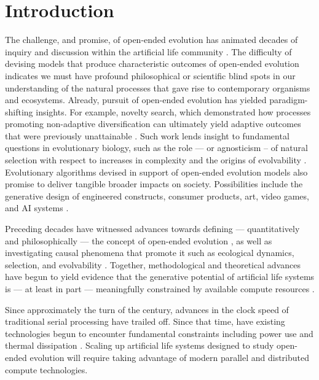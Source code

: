 \section{Introduction}

The challenge, and promise, of open-ended evolution has animated decades of inquiry and discussion within the artificial life community \citep{packard2019overview}.
The difficulty of devising models that produce characteristic outcomes of open-ended evolution indicates we must have profound philosophical or scientific blind spots in our understanding of the natural processes that gave rise to contemporary organisms and ecosystems.
Already, pursuit of open-ended evolution has yielded paradigm-shifting insights.
For example, novelty search, which demonstrated how processes promoting non-adaptive diversification can ultimately yield adaptive outcomes that were previously unattainable \citep{lehman2011abandoning}.
Such work lends insight to fundamental questions in evolutionary biology, such as the role --- or agnosticism -- of natural selection with respect to increases in complexity \citep{lehman2012evolution, lynch2007frailty} and the origins of evolvability \citep{lehman2013evolvability, kirschner1998evolvability}.
Evolutionary algorithms devised in support of open-ended evolution models also promise to deliver tangible broader impacts on society. %
Possibilities include the generative design of engineered constructs, consumer products, art, video games, and AI systems \citep{nguyen2015innovation, stanley2017open}.

Preceding decades have witnessed advances towards defining --- quantitatively and philosophically --- the concept of open-ended evolution \citep{lehman2012beyond, dolson2019modes, bedau1998classification}, as well as investigating causal phenomena that promote it such as ecological dynamics, selection, and evolvability \citep{dolson2019constructive, soros2014identifying, huizinga2018emergence}.
Together, methodological and theoretical advances have begun to yield evidence that the generative potential of artificial life systems is --- at least in part --- meaningfully constrained by available compute resources \citep{channon2019maximum}. %

Since approximately the turn of the century, advances in the clock speed of traditional serial processing have trailed off.
Since that time, have existing technologies begun to encounter fundamental constraints including power use and thermal dissipation \citep{sutter2005free}.
Scaling up artificial life systems designed to study open-ended evolution will require taking advantage of modern parallel and distributed compute technologies.

